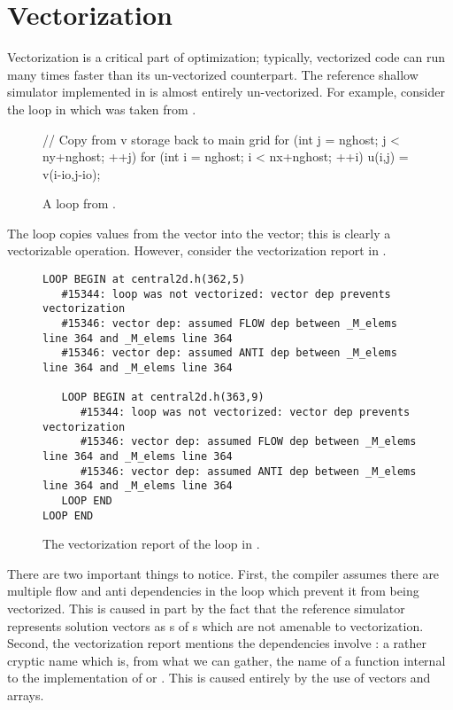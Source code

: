 \section{Vectorization}\label{sec:vectorization}
Vectorization is a critical part of optimization; typically, vectorized code
can run many times faster than its un-vectorized counterpart. The reference
shallow simulator implemented in  is almost entirely
un-vectorized. For example, consider the loop in  which was
taken from .

\begin{figure}[h]
\centering
\begin{CPP}[firstnumber=361]
// Copy from v storage back to main grid
for (int j = nghost; j < ny+nghost; ++j){
    for (int i = nghost; i < nx+nghost; ++i){
        u(i,j) = v(i-io,j-io);
    }
}
\end{CPP}
\caption{A loop from .}
\label{fig:no-vec-code}
\end{figure}

The loop copies values from the  vector into the  vector; this is
clearly a vectorizable operation. However, consider the vectorization report in
.

\begin{figure}[h]
\scriptsize
\begin{verbatim}LOOP BEGIN at central2d.h(362,5)
   #15344: loop was not vectorized: vector dep prevents vectorization
   #15346: vector dep: assumed FLOW dep between _M_elems line 364 and _M_elems line 364
   #15346: vector dep: assumed ANTI dep between _M_elems line 364 and _M_elems line 364

   LOOP BEGIN at central2d.h(363,9)
      #15344: loop was not vectorized: vector dep prevents vectorization
      #15346: vector dep: assumed FLOW dep between _M_elems line 364 and _M_elems line 364
      #15346: vector dep: assumed ANTI dep between _M_elems line 364 and _M_elems line 364
   LOOP END
LOOP END\end{verbatim}
\caption{The vectorization report of the loop in .}
\label{fig:no-vec-report}
\end{figure}

There are two important things to notice. First, the compiler assumes there are
multiple flow and anti dependencies in the loop which prevent it from being
vectorized. This is caused in part by the fact that the reference simulator
represents solution vectors as \cppvec{}s of \cpparr{}s which are not amenable
to vectorization. Second, the vectorization report mentions the dependencies
involve : a rather cryptic name which is, from what we can
gather, the name of a function internal to the implementation of \cppvec{} or
\cpparr{}. This is caused entirely by the use of vectors and arrays.

